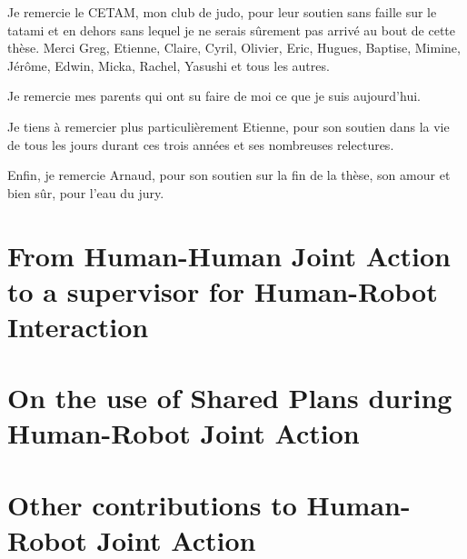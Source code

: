 \documentclass[english,a4paper,11pt,twoside]{StyleThese}
\begin{document}
Je remercie le CETAM, mon club de judo, pour leur soutien sans faille sur le tatami et en dehors sans lequel je ne serais sûrement pas arrivé au bout de cette thèse. Merci Greg, Etienne, Claire, Cyril, Olivier, Eric, Hugues, Baptise, Mimine, Jérôme, Edwin, Micka, Rachel, Yasushi et tous les autres.

Je remercie mes parents qui ont su faire de moi ce que je suis aujourd’hui.

Je tiens à remercier plus particulièrement Etienne, pour son soutien dans la vie de tous les jours durant ces trois années et ses nombreuses relectures.

Enfin, je remercie Arnaud, pour son soutien sur la fin de la thèse, son amour et bien sûr, pour l'eau du jury.



\tableofcontents

\printnomenclature
%

\mainmatter





\setcounter{mtc}{1}

\fancyhead[RE]{\bfseries\nouppercase{\leftmark}}      %
\fancyhead[LO]{\bfseries\nouppercase{\rightmark}}     %

\part{From Human-Human Joint Action to a supervisor for Human-Robot Interaction}




\part{On the use of Shared Plans during Human-Robot Joint Action}





\part{Other contributions to Human-Robot Joint Action}








\appendix







%

\end{document}
